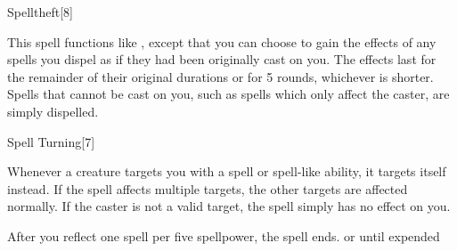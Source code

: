 \begin{spellsection}[Greater]{Spelltheft}[8]
    \begin{spellheader}
    \end{spellheader}
    \begin{spellcontent}
        \spellspecial This spell functions like , except that you can choose to gain the effects of any spells you dispel as if they had been originally cast on you. The effects last for the remainder of their original durations or for 5 rounds, whichever is shorter. Spells that cannot be cast on you, such as spells which only affect the caster, are simply dispelled.
    \end{spellcontent}
    \begin{spellfooter}
        \miscastyou
    \end{spellfooter}
\end{spellsection}

\begin{spellsection}{Spell Turning}[7]
    \begin{spellheader}
    \end{spellheader}
    \begin{spellcontent}
        \begin{spelltargetinginfo}
        \end{spelltargetinginfo}
        \begin{spelleffects}
            \spelleffect Whenever a creature targets you with a spell or spell-like ability, it targets itself instead. If the spell affects multiple targets, the other targets are affected normally. If the caster is not a valid target, the spell simply has no effect on you.

            After you reflect one spell per five spellpower, the spell ends.
            \spelldur \durlong or until expended
        \end{spelleffects}
    \end{spellcontent}
    \begin{spellfooter}
        \miscastexplode
    \end{spellfooter}
\end{spellsection}

